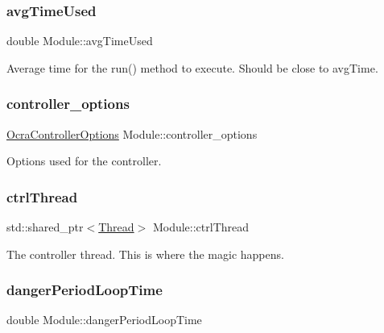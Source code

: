\subsubsection{\texorpdfstring{avg\+Time\+Used}{avgTimeUsed}}
{\footnotesize\ttfamily double Module\+::avg\+Time\+Used\hspace{0.3cm}{\ttfamily [private]}}

Average time for the {\ttfamily run()} method to execute. Should be close to avg\+Time. \hypertarget{classModule_a04156183c6e15f118595e3637ab5372f}{}\label{classModule_a04156183c6e15f118595e3637ab5372f} 
\subsubsection{\texorpdfstring{controller\+\_\+options}{controller\_options}}
{\footnotesize\ttfamily \hyperlink{classOcraControllerOptions}{Ocra\+Controller\+Options} Module\+::controller\+\_\+options\hspace{0.3cm}{\ttfamily [private]}}

Options used for the controller. \hypertarget{classModule_a39346aa2e2a00801e07f4c127ff004ba}{}\label{classModule_a39346aa2e2a00801e07f4c127ff004ba} 
\subsubsection{\texorpdfstring{ctrl\+Thread}{ctrlThread}}
{\footnotesize\ttfamily std\+::shared\+\_\+ptr$<$\hyperlink{classThread}{Thread}$>$ Module\+::ctrl\+Thread\hspace{0.3cm}{\ttfamily [private]}}

The controller thread. This is where the magic happens. \hypertarget{classModule_a33fee1e7f977b4f27a2e1488480996fb}{}\label{classModule_a33fee1e7f977b4f27a2e1488480996fb} 
\subsubsection{\texorpdfstring{danger\+Period\+Loop\+Time}{dangerPeriodLoopTime}}
{\footnotesize\ttfamily double Module\+::danger\+Period\+Loop\+Time\hspace{0.3cm}{\ttfamily [private]}}

